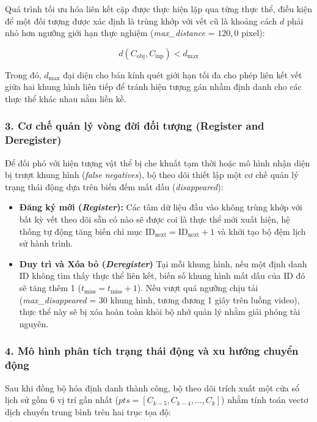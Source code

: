 Quá trình tối ưu hóa liên kết cặp được thực hiện lặp qua từng thực thể, điều kiện để một đối tượng được xác định là trùng khớp với vết cũ là khoảng cách $d$ phải nhỏ hơn ngưỡng giới hạn thực nghiệm (\textit{max\_distance} = $120,0$ pixel):

\begin{equation}
    d(C_{\text{obj}}, C_{\text{inp}}) < d_{\text{max}}
\end{equation}

Trong đó, $d_{\text{max}}$ đại diện cho bán kính quét giới hạn tối đa cho phép liên kết vết giữa hai khung hình liên tiếp để tránh hiện tượng gán nhầm định danh cho các thực thể khác nhau nằm liền kề.

\subsubsection*{3. Cơ chế quản lý vòng đời đối tượng (Register and Deregister)}

Để đối phó với hiện tượng vật thể bị che khuất tạm thời hoặc mô hình nhận diện bị trượt khung hình (\textit{false negatives}), bộ theo dõi thiết lập một cơ chế quản lý trạng thái động dựa trên biến đếm mất dấu (\textit{disappeared}):

\begin{itemize}
    \item \textbf{Đăng ký mới (\textit{Register}):} Các tâm dữ liệu đầu vào không trùng khớp với bất kỳ vết theo dõi sẵn có nào sẽ được coi là thực thể mới xuất hiện, hệ thống tự động tăng biến chỉ mục $\text{ID}_{\text{next}} = \text{ID}_{\text{next}} + 1$ và khởi tạo bộ đệm lịch sử hành trình.
    \item \textbf{Duy trì và Xóa bỏ (\textit{Deregister})} Tại mỗi khung hình, nếu một định danh ID không tìm thấy thực thể liên kết, biến số khung hình mất dấu của ID đó sẽ tăng thêm 1 ($t_{\text{miss}} = t_{\text{miss}} + 1$). Nếu vượt quá ngưỡng chịu tải (\textit{max\_disappeared} = $30$ khung hình, tương đương 1 giây trên luồng video), thực thể này sẽ bị xóa hoàn toàn khỏi bộ nhớ quản lý nhằm giải phóng tài nguyên.
\end{itemize}

\subsubsection*{4. Mô hình phân tích trạng thái động và xu hướng chuyển động}

Sau khi đồng bộ hóa định danh thành công, bộ theo dõi trích xuất một cửa sổ lịch sử gồm $6$ vị trí gần nhất ($pts = [C_{k-5}, C_{k-4}, \dots, C_{k}]$) nhằm tính toán vectơ dịch chuyển trung bình trên hai trục tọa độ:

